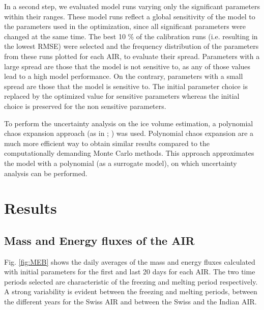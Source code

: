 \documentclass[utf8]{frontiersSCNS} %
\begin{document}
In a second step, we evaluated model runs varying only the significant parameters within their ranges. These model runs
reflect a global sensitivity of the model to the parameters used in the optimization, since all significant parameters
were changed at the same time.  The best 10 \% of the calibration runs (i.e. resulting in the lowest RMSE) were selected
and the frequency distribution of the parameters from these runs plotted for each AIR, to evaluate their spread.
Parameters with a large spread are those that the model is not sensitive to, as any of those values lead to a high model
performance. On the contrary, parameters with a small spread are those that the model is sensitive to. The initial
parameter choice is replaced by the optimized value for sensitive parameters whereas the initial choice is preserved for
the non sensitive parameters.

To perform the uncertainty analysis on the ice volume estimation, a polynomial chaos expansion approach (as in
\cite{uncertainpy_2018}; \cite{Xiu_2005}) was used. Polynomial chaos expansion are a much more efficient way to obtain
similar results compared to the computationally demanding Monte Carlo methods. This approach approximates the model with
a polynomial (as a surrogate model), on which uncertainty analysis can be performed.

\section{Results}

\subsection{Mass and Energy fluxes of the AIR}

Fig. \ref{fig:MEB} shows the daily averages of the mass and energy fluxes calculated with initial parameters for the
first and last 20 days for each AIR. The two time periods selected are characteristic of the freezing and melting period
respectively. A strong variability is evident between the freezing and melting periods, between the different years for
the Swiss AIR and between the Swiss and the Indian AIR.
\end{document}
